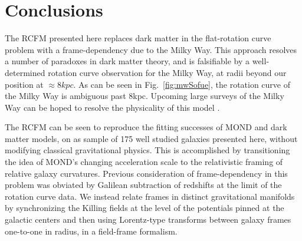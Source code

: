 \documentclass[reprint,%
 amsmath,amssymb,
 aps,
]{revtex4-1}
\begin{document}
 


 



 
 \section{  Conclusions \label{sec:conclu}  }
 
The  RCFM presented here  replaces dark matter in the flat-rotation curve problem with  a frame-dependency due to the Milky Way. This approach resolves a number of paradoxes in dark matter theory, and is falsifiable by a well-determined rotation curve observation for the Milky Way,  at radii beyond our position at $\approx 8 kpc$.  As can be seen in Fig.~\ref{fig:mwSofue}, 
the rotation curve of the Milky Way  is ambiguous  past  $8$kpc. Upcoming large surveys of the Milky Way  can be hoped to resolve the physicality of this model \cite{Ivezić_2019,2022ApJS..259...35A,2010ApJ...716....1B,de_Blok_2010}. 

  
The RCFM can be seen  to reproduce the fitting successes of MOND and dark matter models,   on as  sample of   175  well studied galaxies\cite{2016Lelli} presented here,      without modifying classical gravitational physics.  This is accomplished by transitioning the idea of MOND's changing acceleration scale \cite{McGaugh2016RAR,2022A&A...664A..40M} to the relativistic framing of    relative galaxy curvatures. 
Previous consideration of frame-dependency in this problem was obviated by Galilean subtraction of redshifts at the limit of the rotation curve data\cite{Wald}. We instead relate frames in distinct gravitational manifolds by synchronizing the Killing fields at the level of the potentials pinned at the galactic centers and then using Lorentz-type transforms between  galaxy frames one-to-one in radius, 
in a field-frame formalism. 
 
\end{document}
